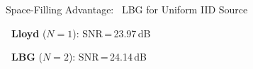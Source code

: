 

\begin{frame}{Space-Filling Advantage: ~LBG for Uniform IID Source}
  \begin{minipage}[t]{0.5\linewidth}
    \begin{center}
      {\bf~Lloyd} ($N=1$): \;SNR\,=\,23.97\,dB\\[1ex]
    \end{center}
  \end{minipage}%
  \begin{minipage}[t]{0.5\linewidth}
    \begin{center}
      {\bf~LBG} ($N=2$): \;SNR\,=\,24.14\,dB\\[1ex]

\end{center}
\end{minipage}
\end{frame}
